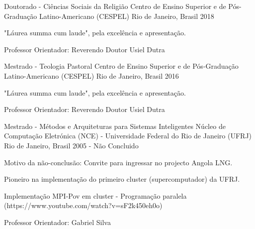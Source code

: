


\begin{cventries}


\cventry
{Doutorado - Ciências Sociais da Religião} %
{Centro de Ensino Superior e de Pós-Graduação Latino-Americano (CESPEL)} %
{Rio de Janeiro, Brasil} %
{2018} %
{ %
\begin{cvitems}
\item {"Láurea summa cum laude", pela excelência e apresentação.}
\item {Professor Orientador: Reverendo Doutor Usiel Dutra}
\end{cvitems}
}


\cventry
{Mestrado - Teologia Pastoral} %
{Centro de Ensino Superior e de Pós-Graduação Latino-Americano (CESPEL)} %
{Rio de Janeiro, Brasil} %
{2016} %
{ %
\begin{cvitems}
\item {"Láurea summa cum laude", pela excelência e apresentação.}
\item {Professor Orientador: Reverendo Doutor Usiel Dutra}
\end{cvitems}
}


\cventry
{Mestrado - Métodos e Arquiteturas para Sistemas Inteligentes} %
{Núcleo de Computação Eletrónica (NCE) - Universidade Federal do Rio de Janeiro (UFRJ)} %
{Rio de Janeiro, Brasil} %
{2005 - Não Concluido} %
{ %
\begin{cvitems}
\item {Motivo da não-conclusão: Convite para ingressar no projecto Angola LNG.}
\item {Pioneiro na implementação do primeiro cluster (supercomputador) da UFRJ.}
\item {Implementação MPI-Pov em cluster - Programação paralela (https://www.youtube.com/watch?v=sF2k450eh0o)}
\item {Professor Orientador: Gabriel Silva}
\end{cvitems}
}


\end{cventries}
